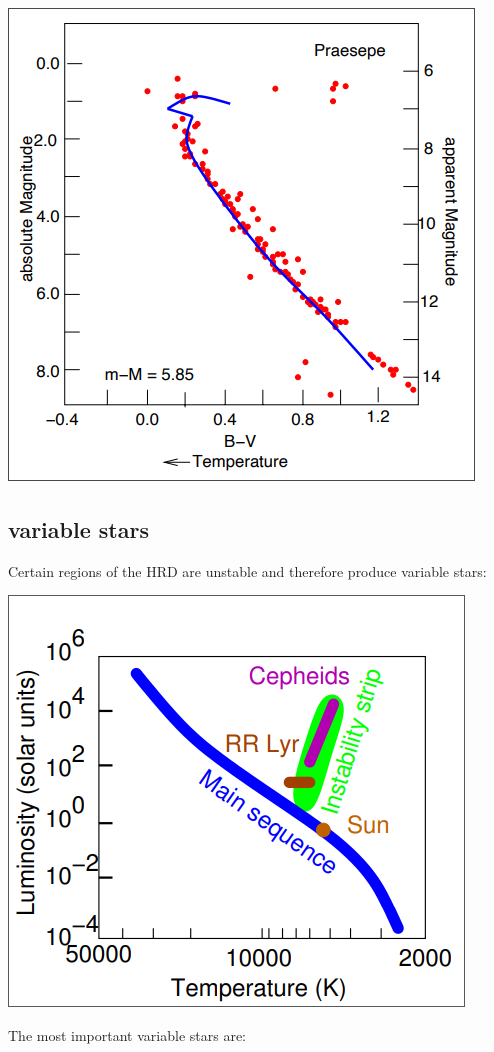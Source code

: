 \documentclass[11pt,a4paper]{article}
\begin{document}
\begin{center}
    \includegraphics[width=0.5\linewidth]{screenshot_2024-01-23-112801.png}
\end{center}
\subsection{variable stars}
Certain regions of the HRD are unstable and therefore produce variable stars:
\begin{center}
    \includegraphics[width=0.5\linewidth]{screenshot_2024-01-23-113048.png}
\end{center}
The most important variable stars are: 
\end{document}
